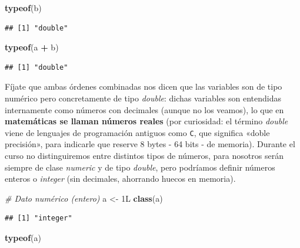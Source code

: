 \documentclass[11pt,]{book}
\newenvironment{Shaded}{\begin{snugshade}}{\end{snugshade}}
\newcommand{\CommentTok}[1]{\textcolor[rgb]{0.37,0.37,0.37}{\textit{#1}}}
\newcommand{\KeywordTok}[1]{\textcolor[rgb]{0.27,0.27,0.27}{\textbf{#1}}}
\newcommand{\NormalTok}[1]{#1}
\newcommand{\OperatorTok}[1]{\textcolor[rgb]{0.43,0.43,0.43}{\textbf{#1}}}
\newcommand{\StringTok}[1]{\textcolor[rgb]{0.5,0.5,0.5}{#1}}
\begin{document}
\begin{Shaded}
\begin{Highlighting}[]
\KeywordTok{typeof}\NormalTok{(b)}
\end{Highlighting}
\end{Shaded}

\begin{verbatim}
## [1] "double"
\end{verbatim}

\begin{Shaded}
\begin{Highlighting}[]
\KeywordTok{typeof}\NormalTok{(a }\OperatorTok{+}\StringTok{ }\NormalTok{b)}
\end{Highlighting}
\end{Shaded}

\begin{verbatim}
## [1] "double"
\end{verbatim}

Fíjate que ambas órdenes combinadas nos dicen que las variables son de tipo numérico pero concretamente de tipo \emph{double}: dichas variables son entendidas internamente como números con decimales (aunque no los veamos), lo que en \textbf{matemáticas se llaman números reales} (por curiosidad: el término \emph{double} viene de lenguajes de programación antiguos como \texttt{C}, que significa «doble precisión», para indicarle que reserve 8 bytes - 64 bits - de memoria). Durante el curso no distinguiremos entre distintos tipos de números, para nosotros serán siempre de clase \emph{numeric} y de tipo \emph{double}, pero podríamos definir números enteros o \emph{integer} (sin decimales, ahorrando huecos en memoria).

\begin{Shaded}
\begin{Highlighting}[]
\CommentTok{# Dato numérico (entero)}
\NormalTok{a <-}\StringTok{ }\NormalTok{1L}
\KeywordTok{class}\NormalTok{(a)}
\end{Highlighting}
\end{Shaded}

\begin{verbatim}
## [1] "integer"
\end{verbatim}

\begin{Shaded}
\begin{Highlighting}[]
\KeywordTok{typeof}\NormalTok{(a)}
\end{Highlighting}
\end{Shaded}
\end{document}
